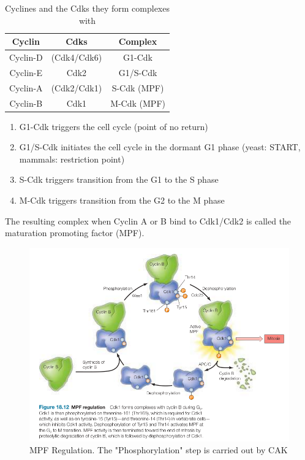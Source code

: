 \documentclass{article}
\begin{document}
	\begin{table}[h]
		\centering
		\begin{tabular}{|c|c|c|} \hline
			Cyclin & Cdks & Complex \\ \hline
			Cyclin-D & (Cdk4/Cdk6)  & G1-Cdk \\ \hline
			Cyclin-E & Cdk2         & G1/S-Cdk \\ \hline
			Cyclin-A & (Cdk2/Cdk1)  & S-Cdk (MPF) \\ \hline
			Cyclin-B & Cdk1         & M-Cdk (MPF)\\ \hline
		\end{tabular}
		\caption{Cyclines and the Cdks they form complexes with}
	\end{table}

	\begin{enumerate}[label=\textbullet]
		\item G1-Cdk triggers the cell cycle (point of no return)
		\item G1/S-Cdk initiates the cell cycle in the dormant G1 phase  (yeast: START, mammals: restriction point)
		\item S-Cdk triggers transition from the G1 to the S phase 
		\item M-Cdk triggers transition from the G2 to the M phase 
	\end{enumerate}

	The resulting complex when Cyclin A or B bind to Cdk1/Cdk2 is called the maturation promoting factor (MPF).
	
	\begin{figure}[H]
		\centering
		\includegraphics[width=\linewidth]{mpf_regulation_cooper.png}
		\caption{MPF Regulation. The "Phosphorylation" step is carried out by CAK}
	\end{figure}
\end{document}
